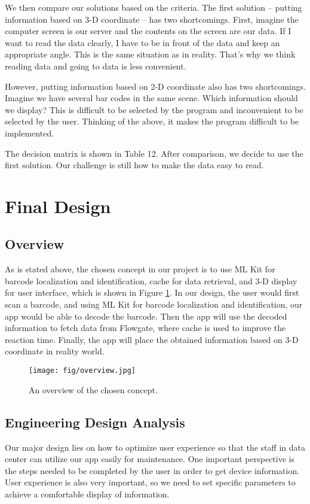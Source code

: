 \documentclass[11pt,a4paper]{article}
\begin{document}
\begin{onehalfspace}
We then compare our solutions based on the criteria. The first solution -- putting information based on 3-D coordinate -- has two shortcomings. First, imagine the computer screen is our server and the contents on the screen are our data. If I want to read the data clearly, I have to be in front of the data and keep an appropriate angle. This is the same situation as in reality. That's why we think reading data and going to data is less convenient. 

However, putting information based on 2-D coordinate also has two shortcomings. Imagine we have several bar codes in the same scene. Which information should we display? This is difficult to be selected by the program and inconvenient to be selected by the user. Thinking of the above, it makes the program difficult to be implemented.

The decision matrix is shown in Table 12. After comparison, we decide to use the first solution. Our challenge is still how to make the data easy to read.



\section{Final Design}
\subsection{Overview}
As is stated above, the chosen concept in our project is to use ML Kit for barcode localization and identification, cache for data retrieval, and 3-D display for user interface, which is shown in Figure \ref{fig:overview}. In our design, the user would first scan a barcode, and using ML Kit for barcode localization and identification, our app would be able to decode the barcode. Then the app will use the decoded information to fetch data from Flowgate, where cache is used to improve the reaction time. Finally, the app will place the obtained information based on 3-D coordinate in reality world.
\begin{figure}[H]
    \centering
    \texttt{[image: fig/overview.jpg]}
    \caption{An overview of the chosen concept.}
    \label{fig:overview}
\end{figure}

\subsection{Engineering Design Analysis}
Our major design lies on how to optimize user experience so that the staff in data center can utilize our app easily for maintenance. One important perspective is the steps needed to be completed by the user in order to get device information. User experience is also very important, so we need to set specific parameters to achieve a comfortable display of information.


\end{onehalfspace}
\end{document}
